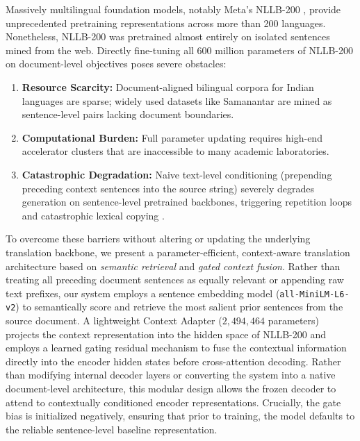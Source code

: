 \documentclass[conference]{IEEEtran}
\begin{document}
Massively multilingual foundation models, notably Meta's NLLB-200 \cite{costajussa2022nllb}, provide unprecedented pretraining representations across more than 200 languages. Nonetheless, NLLB-200 was pretrained almost entirely on isolated sentences mined from the web. Directly fine-tuning all 600 million parameters of NLLB-200 on document-level objectives poses severe obstacles:
\begin{enumerate}
    \item \textbf{Resource Scarcity:} Document-aligned bilingual corpora for Indian languages are sparse; widely used datasets like Samanantar \cite{ramesh-etal-2022-samanantar} are mined as sentence-level pairs lacking document boundaries.
    \item \textbf{Computational Burden:} Full parameter updating requires high-end accelerator clusters that are inaccessible to many academic laboratories.
    \item \textbf{Catastrophic Degradation:} Naive text-level conditioning (prepending preceding context sentences into the source string) severely degrades generation on sentence-level pretrained backbones, triggering repetition loops and catastrophic lexical copying \cite{kim-etal-2019-document}.
\end{enumerate}

To overcome these barriers without altering or updating the underlying translation backbone, we present a parameter-efficient, context-aware translation architecture based on \textit{semantic retrieval} and \textit{gated context fusion}. Rather than treating all preceding document sentences as equally relevant or appending raw text prefixes, our system employs a sentence embedding model (\texttt{all-MiniLM-L6-v2}) \cite{reimers-gurevych-2019-sentence, wang2020minilm} to semantically score and retrieve the most salient prior sentences from the source document. A lightweight Context Adapter ($2,494,464$ parameters) projects the context representation into the hidden space of NLLB-200 and employs a learned gating residual mechanism to fuse the contextual information directly into the encoder hidden states before cross-attention decoding. Rather than modifying internal decoder layers or converting the system into a native document-level architecture, this modular design allows the frozen decoder to attend to contextually conditioned encoder representations. Crucially, the gate bias is initialized negatively, ensuring that prior to training, the model defaults to the reliable sentence-level baseline representation.
\end{document}
